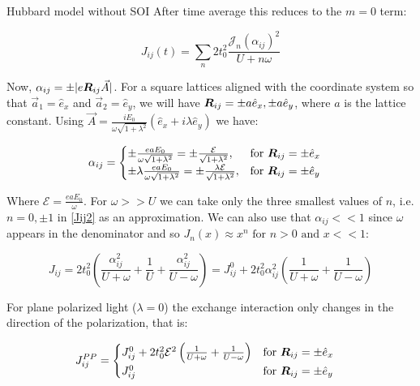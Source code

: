 \begin{section}{Hubbard model without SOI}
After time average this reduces to the $m=0$ term:

\begin{equation}
\label{Jij2}
J_{ij}(t) = \sum_{n} 2t_0^2 \frac{\mathcal{J}_n(\alpha_{ij})^2}{U+n\omega}
\end{equation}

Now, $\alpha_{ij} = \pm|e\boldsymbol{R}_{ij}\vec{A}|$. For a square lattices aligned with the coordinate system so that $\vec{a}_1=\hat{e}_x$ and $\vec{a}_2=\hat{e}_y$, we will have $\boldsymbol{R}_{ij} = \pm a\hat{e}_x,\pm a\hat{e}_y$, where $a$ is the lattice constant. Using $\vec{A}=\frac{iE_0}{\omega\sqrt{1+\lambda^2}}(\hat{e}_x+i\lambda\hat{e}_y)$ we have:

\begin{equation}
\alpha_{ij} = \begin{cases}
             \pm \frac{eaE_0}{\omega \sqrt{1+\lambda^2}} = \pm \frac{\mathcal{E}}{\sqrt{1+\lambda^2}},  & \text{for } \boldsymbol{R}_{ij} = \pm \hat{e}_x \\
             \pm \lambda\frac{eaE_0}{\omega \sqrt{1+\lambda^2}} = \pm \frac{\lambda \mathcal{E}}{\sqrt{1+\lambda^2}},  & \text{for } \boldsymbol{R}_{ij} = \pm \hat{e}_y
       \end{cases} \quad
\end{equation}

Where $\mathcal{E} = \frac{eaE_0}{\omega}$. For $\omega>>U$ we can take only the three smallest values of $n$, i.e. $n=0, \pm 1$ in \ref{Jij2} as an approximation. We can also use that $\alpha_{ij} << 1$ since $\omega$ appears in the denominator and so $J_n(x) \approx x^n \text{ for } n>0 \text{ and } x << 1$:

\begin{equation}
J_{ij} = 2t_0^2 \left(\frac{\alpha_{ij}^2}{U+\omega} +\frac{1}{U} +\frac{\alpha_{ij}^2}{U-\omega} \right) = J_{ij}^0 + 2t_0^2 \alpha_{ij}^2 \left( \frac{1}{U+\omega} + \frac{1}{U-\omega} \right)
\end{equation}

For plane polarized light ($\lambda = 0$) the exchange interaction only changes in the direction of the polarization, that is:

\begin{equation}
J_{ij}^{PP} = \begin{cases}
		J_{ij}^0 + 2t_0^2 \mathcal{E}^2 \left( \frac{1}{U+\omega} + \frac{1}{U-\omega} \right) & \text{for } \boldsymbol{R}_{ij} = \pm \hat{e}_x \\
J_{ij}^0 & \text{for } \boldsymbol{R}_{ij} = \pm \hat{e}_y
\end{cases} \quad 
\end{equation}


\end{section}
